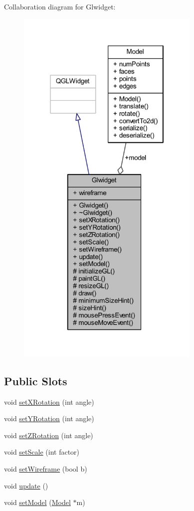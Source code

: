 Collaboration diagram for Glwidget\+:\nopagebreak
\begin{figure}[H]
\begin{center}
\leavevmode
\includegraphics[width=250pt]{class_glwidget__coll__graph}
\end{center}
\end{figure}
\subsection*{Public Slots}
\begin{DoxyCompactItemize}
\item 
void \mbox{\hyperlink{class_glwidget_abdb807d1e98041d3813543dd2f043d9e}{set\+X\+Rotation}} (int angle)
\item 
void \mbox{\hyperlink{class_glwidget_a980d52bca9bf5817911029877a68e584}{set\+Y\+Rotation}} (int angle)
\item 
void \mbox{\hyperlink{class_glwidget_ad9318fc18c0abc761ce038c6afbf1814}{set\+Z\+Rotation}} (int angle)
\item 
void \mbox{\hyperlink{class_glwidget_a2ea79df264aadd3584488296749f370c}{set\+Scale}} (int factor)
\item 
void \mbox{\hyperlink{class_glwidget_a52a956313956890bf13741c218f8fa3d}{set\+Wireframe}} (bool b)
\item 
void \mbox{\hyperlink{class_glwidget_a2b49ec71ab84e52adc78ba062c235ac0}{update}} ()
\item 
void \mbox{\hyperlink{class_glwidget_a2786dcfd2ee92efbbd2c457dc1ac7063}{set\+Model}} (\mbox{\hyperlink{class_model}{Model}} $\ast$m)
\end{DoxyCompactItemize}
